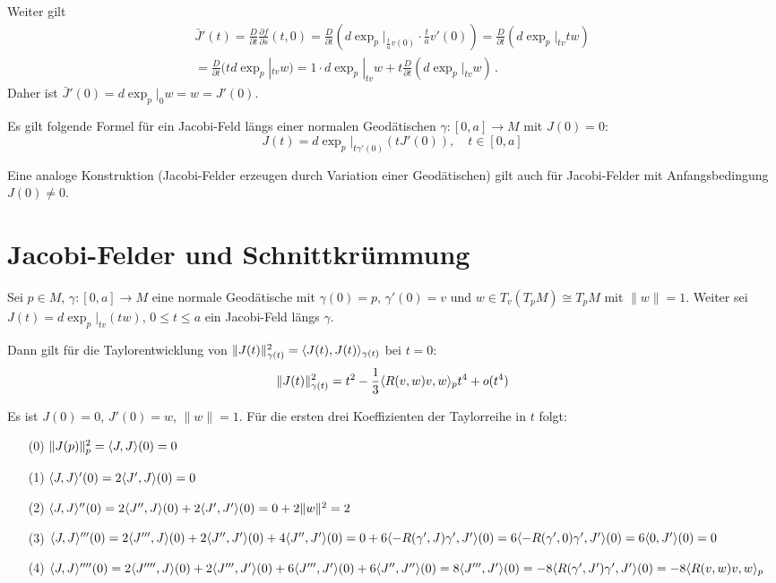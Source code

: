 \documentclass[a4paper,twoside,DIV15,BCOR12mm]{scrbook}
\begin{document}
\begin{beispiel}
\begin{beweis}
Weiter gilt
\begin{multline*}
\bar J'(t) = \frac D {\partial t} \frac {\partial f}{\partial s} (t,0) = \frac D {\partial t}(d\exp_p|_{\frac t a v(0)} \cdot \frac t a v'(0))  = \frac D{\partial t} (d\exp_p|_{tv} tw) \\ = \frac D{\partial t}( t d\exp_p|_{tv} w) = 1\cdot d\exp_p|_{tv} w + t \frac D{\partial t}(d\exp_p|_{tv} w)\,.
\end{multline*}
Daher ist $\bar J'(0) = d\exp_p|_0 w = w = J'(0)$.
\end{beweis}

\begin{bemerkungen}
\item Es gilt folgende Formel für ein Jacobi-Feld längs einer normalen Geodätischen $\gamma:[0,a] \to M$ mit $J(0) = 0$:
\[
J(t) = d\exp_p|_{t\gamma'(0)} (tJ'(0)),\quad t\in[0,a]
\]

\item Eine analoge Konstruktion (Jacobi-Felder erzeugen durch Variation einer Geodätischen) gilt auch für Jacobi-Felder mit Anfangsbedingung $J(0)\ne 0$.
\end{bemerkungen}

\section{Jacobi-Felder und Schnittkrümmung}

\begin{satz}
Sei $p\in M$, $\gamma:[0,a]\to M$ eine normale Geodätische mit $\gamma(0)=p$, $\gamma'(0)=v$ und $w \in T_v(T_pM) \cong T_pM$ mit $\|w\| = 1$.  Weiter sei $J(t) = d\exp_p|_{tv}(tw)$, $0\le t \le a$ ein Jacobi-Feld längs $\gamma$.

Dann gilt für die Taylorentwicklung von $\|J(t)\|^2_{\gamma(t)} = \langle J(t),J(t)\rangle_{\gamma(t)}$ bei $t=0$:
\[
\|J(t)\|_{\gamma(t)}^2 = t^2 - \frac 13 \langle R(v,w)v,w\rangle_p t^4 + o(t^4)
\]
\end{satz}

\begin{beweis}
Es ist $J(0)=0$, $J'(0) = w$, $\|w\|=1$. Für die ersten drei Koeffizienten der Taylorreihe in $t$ folgt:
\begin{enumerate}
\item[(0)] $\|J(p)\|_p^2 = \langle J,J\rangle (0) = 0$
\item[(1)] $\langle J,J\rangle '(0) = 2\langle J',J\rangle(0) = 0$
\item[(2)] $\langle J,J\rangle''(0) = 2\langle J'',J\rangle(0) + 2 \langle J',J'\rangle(0) = 0 + 2\|w\|^2 = 2$
\item[(3)] $\langle J,J\rangle'''(0) = 2\langle J''',J\rangle (0) + 2 \langle J'',J'\rangle (0) + 4 \langle J'',J'\rangle(0) = 0 + 6 \langle-R(\gamma',J)\gamma',J'\rangle(0) = 6 \langle-R(\gamma',0)\gamma',J'\rangle(0) = 6 \langle0,J'\rangle(0) = 0$
\item[(4)] $\langle J,J\rangle ''''(0) = 2 \langle J'''',J\rangle(0) + 2 \langle J''',J'\rangle(0) + 6 \langle J''',J'\rangle(0) + 6 \langle J'',J''\rangle(0) = 8 \langle J''',J'\rangle(0) = -8 \langle R(\gamma',J')\gamma',J'\rangle(0) = -8 \langle R(v,w)v,w\rangle_p$


\end{enumerate}
\end{beweis}
\end{beispiel}
\end{document}
